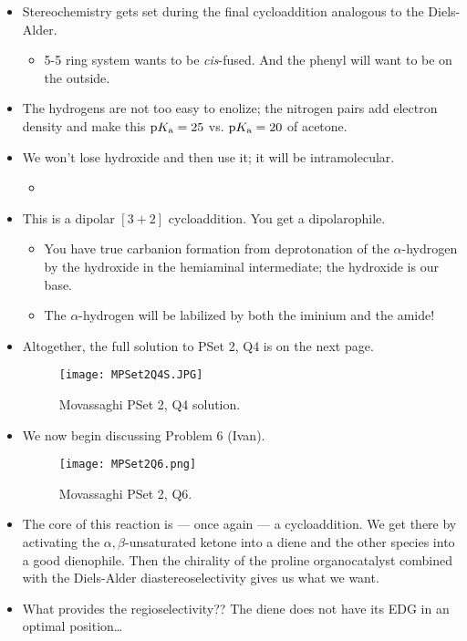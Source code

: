 \documentclass[../notes.tex]{subfiles}
\begin{document}
\begin{itemize}
    \item Stereochemistry gets set during the final cycloaddition analogous to the Diels-Alder.
    \begin{itemize}
        \item 5-5 ring system wants to be \emph{cis}-fused. And the phenyl will want to be on the outside.
    \end{itemize}
    \item The hydrogens are not too easy to enolize; the nitrogen pairs add electron density and make this $\textup{p}K_\textup{a}=25$ vs. $\textup{p}K_\textup{a}=20$ of acetone.
    \item We won't lose hydroxide and then use it; it will be intramolecular.
    \begin{itemize}
        \item 
    \end{itemize}
    \item This is a dipolar $[3+2]$ cycloaddition. You get a dipolarophile.
    \begin{itemize}
        \item You have true carbanion formation from deprotonation of the $\alpha$-hydrogen by the hydroxide in the hemiaminal intermediate; the hydroxide is our base.
        \item The $\alpha$-hydrogen will be labilized by both the iminium and the amide!
    \end{itemize}
    \item Altogether, the full solution to PSet 2, Q4 is on the next page.
    \begin{figure}[h!]
        \centering
        \texttt{[image: MPSet2Q4S.JPG]}
        \caption{Movassaghi PSet 2, Q4 solution.}
        \label{fig:MPSet2Q4S}
    \end{figure}
    \pagebreak
    \item We now begin discussing Problem 6 (Ivan).
    \begin{figure}[h!]
        \centering
        \texttt{[image: MPSet2Q6.png]}
        \caption{Movassaghi PSet 2, Q6.}
        \label{fig:MPSet2Q6}
    \end{figure}
    \item The core of this reaction is --- once again --- a cycloaddition. We get there by activating the $\alpha,\beta$-unsaturated ketone into a diene and the other species into a good dienophile. Then the chirality of the proline organocatalyst combined with the Diels-Alder diastereoselectivity gives us what we want.
    \item What provides the regioselectivity?? The diene does not have its EDG in an optimal position\dots

\end{itemize}
\end{document}
